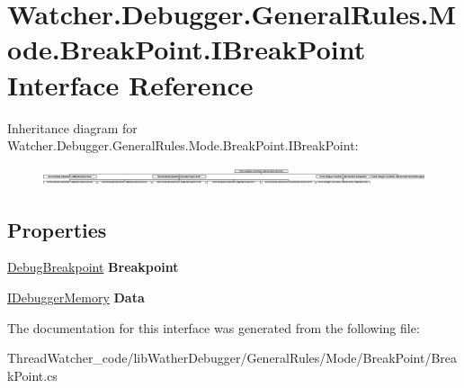 \hypertarget{interface_watcher_1_1_debugger_1_1_general_rules_1_1_mode_1_1_break_point_1_1_i_break_point}{\section{Watcher.\+Debugger.\+General\+Rules.\+Mode.\+Break\+Point.\+I\+Break\+Point Interface Reference}
\label{interface_watcher_1_1_debugger_1_1_general_rules_1_1_mode_1_1_break_point_1_1_i_break_point}
}
Inheritance diagram for Watcher.\+Debugger.\+General\+Rules.\+Mode.\+Break\+Point.\+I\+Break\+Point\+:\begin{figure}[H]
\begin{center}
\leavevmode
\includegraphics[height=0.552995cm]{interface_watcher_1_1_debugger_1_1_general_rules_1_1_mode_1_1_break_point_1_1_i_break_point}
\end{center}
\end{figure}
\subsection*{Properties}
\begin{DoxyCompactItemize}
\item 
\hypertarget{interface_watcher_1_1_debugger_1_1_general_rules_1_1_mode_1_1_break_point_1_1_i_break_point_a6ca27948c4721b559c267be0684e26cb}{\hyperlink{classlib_wather_debugger_1_1_breakpoint_1_1_debug_breakpoint}{Debug\+Breakpoint} {\bfseries Breakpoint}}\label{interface_watcher_1_1_debugger_1_1_general_rules_1_1_mode_1_1_break_point_1_1_i_break_point_a6ca27948c4721b559c267be0684e26cb}

\item 
\hypertarget{interface_watcher_1_1_debugger_1_1_general_rules_1_1_mode_1_1_break_point_1_1_i_break_point_a098cc00d83ada21fb01690eaeceb9111}{\hyperlink{interfacelib_utilities_1_1_i_debugger_memory}{I\+Debugger\+Memory} {\bfseries Data}}\label{interface_watcher_1_1_debugger_1_1_general_rules_1_1_mode_1_1_break_point_1_1_i_break_point_a098cc00d83ada21fb01690eaeceb9111}

\end{DoxyCompactItemize}


The documentation for this interface was generated from the following file\+:\begin{DoxyCompactItemize}
\item 
Thread\+Watcher\+\_\+code/lib\+Wather\+Debugger/\+General\+Rules/\+Mode/\+Break\+Point/Break\+Point.\+cs\end{DoxyCompactItemize}
